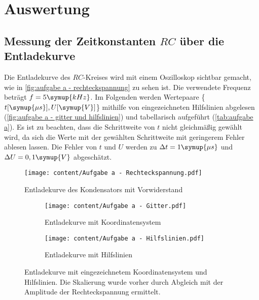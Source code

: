\section{Auswertung}
\label{sec:Auswertung}
\subsection{Messung der Zeitkonstanten $RC$ über die Entladekurve}
Die Entladekurve des $RC$-Kreises wird mit einem Oszilloskop sichtbar gemacht, wie 
in \autoref{fig:aufgabe a - rechteckspannung} zu sehen ist. Die verwendete Frequenz beträgt $f=5\symup{kHz}$.
Im Folgenden werden Wertepaare \{$t [\symup{\mu s}], U [\symup{V}]$\} mithilfe von eingezeichneten Hilfslinien abgelesen
(\autoref{fig:aufgabe a - gitter und hilfslinien}) und tabellarisch aufgeführt (\autoref{tab:aufgabe a}). Es ist zu beachten,
dass die Schrittweite von $t$ nicht gleichmäßig gewählt wird, da sich die Werte mit der gewählten Schrittweite mit
geringerem Fehler ablesen lassen. Die Fehler von $t$ und $U$ werden zu
 $\Delta t = 1\symup{\mu s}$ und $\Delta U = 0,1\symup{V}$ abgeschätzt.

\begin{figure}
  \centering
  \texttt{[image: content/Aufgabe a - Rechteckspannung.pdf]}
  \caption{Entladekurve des Kondensators mit Vorwiderstand}
  \label{fig:aufgabe a - rechteckspannung}
\end{figure}

\begin{figure}
  \begin{subfigure}{0.48\textwidth}
    \centering
    \texttt{[image: content/Aufgabe a - Gitter.pdf]}
    \caption{Entladekurve mit Koordinatensystem}
    \label{fig:aufgabe a - gitter}
  \end{subfigure}
  \hfill
  \begin{subfigure}{0.48\textwidth}
    \centering
    \texttt{[image: content/Aufgabe a - Hilfslinien.pdf]}
    \caption{Entladekurve mit Hilfslinien}
    \label{fig:aufgabe a - hilfslinien}
  \end{subfigure}
  \caption{Entladekurve mit eingezeichnetem Koordinatensystem und Hilfslinien. Die %
    Skalierung wurde vorher durch Abgleich mit der Amplitude der Rechteckspannung ermittelt.}
  \label{fig:aufgabe a - gitter und hilfslinien}
\end{figure}

